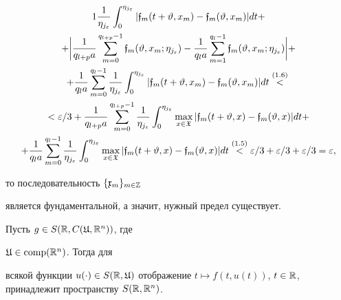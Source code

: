 \begin{pf}
\begin{gather*}
{1}\frac{1}{\eta_{j_\varepsilon}}


\int_0^{\eta_{j_\varepsilon}}|\frak f_m(t+\vartheta,x_m)-


\frak f_m(\vartheta,x_m)|dt+\\


+\bigg|\frac{1}{q_{l+p}a}\sum_{m=0}^{q_{l+p}-1}


\frak f_m(\vartheta,x_m;\eta_{j_\varepsilon})-


\frac{1}{q_la}\sum_{m=1}^{q_l-1}


\frak f_m(\vartheta,x_m;\eta_{j_\varepsilon})\bigg|+ \\


+\frac{1}{q_la}\sum_{m=0}^{q_l-1}\frac{1}{\eta_{j_\varepsilon}}


\int_0^{\eta_{j_\varepsilon}}|


\frak f_m(t+\vartheta,x_m)-\frak f_m(\vartheta,x_m)|dt


\up{(1.6)}{<}{} \\


<\varepsilon/3+\frac{1}{q_{l+p}a}\sum_{m=0}^{q_{l+p}-1}


\frac{1}{\eta_{j_\varepsilon}}\int_0^{\eta_{j_\varepsilon}}


\max_{x\in\frak X}|\frak f_m(t+\vartheta,x)-\frak f_m(\vartheta,x)|dt+\\


+\frac{1}{q_la}\sum_{m=0}^{q_l-1}\frac{1}{\eta_{j_\varepsilon}}


\int_0^{\eta_{j_\varepsilon}}


\max_{x\in\frak X}|\frak f_m(t+\vartheta,x)-


\frak f_m(\vartheta,x)|dt


\up{(1.5)}{<}{}\varepsilon/3+\varepsilon/3+\varepsilon/3=\varepsilon,


\end{gather*}


то последовательность $\{\frak x_m\}_{m\in\Bbb Z}$


является фундаментальной, а значит, нужный предел существует.


\end{pf}








\begin{lems}[{\myfont [4]}]


Пусть $g\in S(\Bbb R, C({\frak U},\Bbb R^n))$, где


$\frak U\in \operatorname{comp}(\Bbb R^n)$. Тогда для


всякой функции $u(\cdot)\in S(\Bbb R,\frak U)$ отображение $t\mapsto


f(t,u(t))$, $t\in\Bbb R$, принадлежит пространству $S(\Bbb R,\Bbb R^n)$.


\end{lems}









